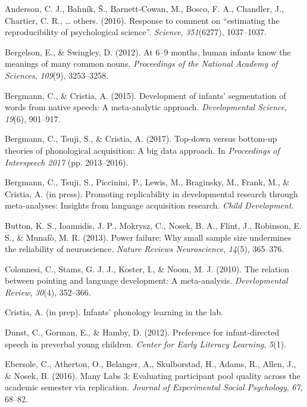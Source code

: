 \documentclass[english,floatsintext,man]{apa6}
\theoremstyle{definition}
\theoremstyle{definition}
\theoremstyle{remark}
\begin{document}
\hypertarget{refs}{}
\hypertarget{ref-anderson2016response}{}
Anderson, C. J., Bahník, Š., Barnett-Cowan, M., Bosco, F. A., Chandler,
J., Chartier, C. R., \ldots{} others. (2016). Response to comment on
``estimating the reproducibility of psychological science''.
\emph{Science}, \emph{351}(6277), 1037--1037.

\hypertarget{ref-bergelson2016}{}
Bergelson, E., \& Swingley, D. (2012). At 6--9 months, human infants
know the meanings of many common nouns. \emph{Proceedings of the
National Academy of Sciences}, \emph{109}(9), 3253--3258.

\hypertarget{ref-bergmann2015development}{}
Bergmann, C., \& Cristia, A. (2015). Development of infants'
segmentation of words from native speech: A meta-analytic approach.
\emph{Developmental Science}, \emph{19}(6), 901--917.

\hypertarget{ref-bergmann2017}{}
Bergmann, C., Tsuji, S., \& Cristia, A. (2017). Top-down versus
bottom-up theories of phonological acquisition: A big data approach. In
\emph{Proceedings of Interspeech 2017} (pp. 2013--2016).

\hypertarget{ref-bergmanneducational}{}
Bergmann, C., Tsuji, S., Piccinini, P., Lewis, M., Braginsky, M., Frank,
M., \& Cristia, A. (in press). Promoting replicability in developmental
research through meta-analyses: Insights from language acquisition
research. \emph{Child Development}.

\hypertarget{ref-button2013power}{}
Button, K. S., Ioannidis, J. P., Mokrysz, C., Nosek, B. A., Flint, J.,
Robinson, E. S., \& Munafò, M. R. (2013). Power failure: Why small
sample size undermines the reliability of neuroscience. \emph{Nature
Reviews Neuroscience}, \emph{14}(5), 365--376.

\hypertarget{ref-colonnesi2010relation}{}
Colonnesi, C., Stams, G. J. J., Koster, I., \& Noom, M. J. (2010). The
relation between pointing and language development: A meta-analysis.
\emph{Developmental Review}, \emph{30}(4), 352--366.

\hypertarget{ref-cristiastatisticalinprep}{}
Cristia, A. (in prep). Infants' phonology learning in the lab.

\hypertarget{ref-dunst2012preference}{}
Dunst, C., Gorman, E., \& Hamby, D. (2012). Preference for
infant-directed speech in preverbal young children. \emph{Center for
Early Literacy Learning}, \emph{5}(1).

\hypertarget{ref-ebersole2015many}{}
Ebersole, C., Atherton, O., Belanger, A., Skulborstad, H., Adams, R.,
Allen, J., \& Nosek, B. (2016). Many Labs 3: Evaluating participant pool
quality across the academic semester via replication. \emph{Journal of
Experimental Social Psychology}, \emph{67}, 68--82.
\end{document}
